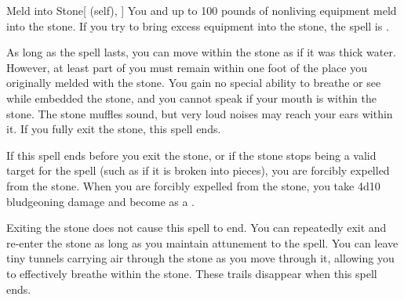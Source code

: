 \lowercase{\hypertarget{spell:Meld into Stone}{}}\label{spell:Meld into Stone}
\begin{attuneability}[Rank 3]{\hypertarget{spell:Meld into Stone}{Meld into Stone}}[ (self), ]
You and up to 100 pounds of nonliving equipment meld into the stone.
If you try to bring excess equipment into the stone, the spell is .

As long as the spell lasts, you can move within the stone as if it was thick water.
However, at least part of you must remain within one foot of the place you originally melded with the stone.
You gain no special ability to breathe or see while embedded the stone, and you cannot speak if your mouth is within the stone.
The stone muffles sound, but very loud noises may reach your ears within it.
If you fully exit the stone, this spell ends.

If this spell ends before you exit the stone, or if the stone stops being a valid target for the spell (such as if it is broken into pieces), you are forcibly expelled from the stone.
When you are forcibly expelled from the stone, you take 4d10 bludgeoning damage and become  as a .

\rankline
{} Exiting the stone does not cause this spell to end.
You can repeatedly exit and re-enter the stone as long as you maintain attunement to the spell.
 You can leave tiny tunnels carrying air through the stone as you move through it, allowing you to effectively breathe within the stone.
These trails disappear when this spell ends.

\end{attuneability}
\vspace{0.25em}



